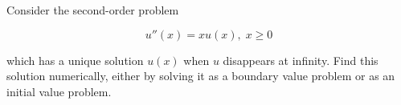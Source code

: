 Consider the second-order problem

$$
u''(x) = x u(x),\; x \ge 0
$$

which has a unique solution $u(x)$ when $u$ disappears at infinity. Find this solution numerically, either by solving
it as a boundary value problem or as an initial value problem.

\begin{solution}\ \\\\
    \ \\
\end{solution}
